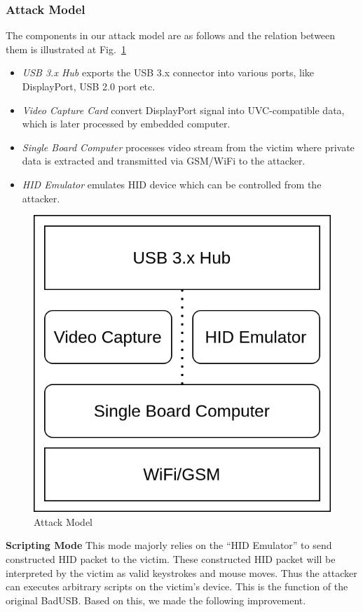 \subsubsection{Attack Model}
The components in our attack model are as follows and the relation between them is illustrated at Fig.~\ref{fig:attack_model}
\begin{itemize}
	\item\textit{USB 3.x Hub} exports the USB 3.x connector into various ports, like DisplayPort, USB 2.0 port etc.
	\item\textit{Video Capture Card} convert DisplayPort signal into UVC-compatible data, which is later processed by embedded computer.
	\item\textit{Single Board Computer} processes video stream from the victim where private data is extracted and transmitted via GSM/WiFi to the attacker.
	\item\textit{HID Emulator} emulates HID device which can be controlled from the attacker.
\end{itemize}
\begin{figure}[htbp]
	\centering
	\includegraphics[width=0.75\linewidth]{./Figs/attack_model.png}
	\caption{Attack Model}
	\label{fig:attack_model}
\end{figure}
\textbf{Scripting Mode} This mode majorly relies on the ``HID Emulator'' to send constructed HID packet to the victim. These constructed HID packet will be interpreted by the victim as valid keystrokes and mouse moves. Thus the attacker can executes arbitrary scripts on the victim's device. This is the function of the original BadUSB. Based on this, we made the following improvement.

